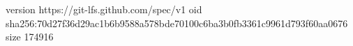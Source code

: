 version https://git-lfs.github.com/spec/v1
oid sha256:70d27f36d29ac1b6b9588a578bde70100c6ba3b0fb3361c9961d793f60aa0676
size 174916
